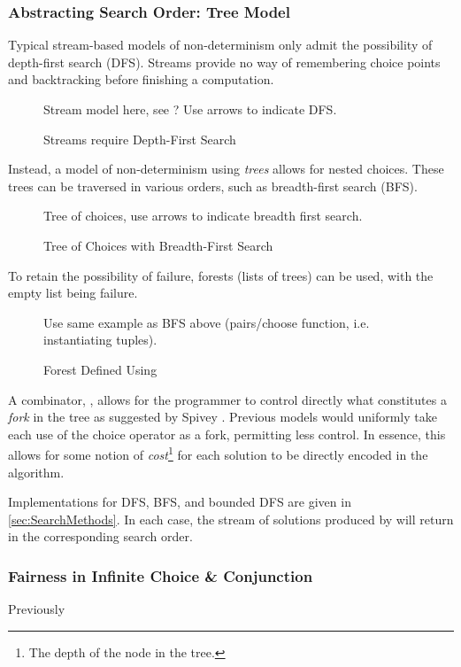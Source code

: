 \subsubsection{Abstracting Search Order: Tree Model}
Typical stream-based models of non-determinism \cite{ListOfSuccess} only admit the possibility of depth-first search (DFS). Streams provide no way of remembering choice points and backtracking before finishing a computation. 

\begin{figure}[h]
Stream model here, see \cite{BFSCombinators}?
Use arrows to indicate DFS.
\caption{Streams require Depth-First Search}
\end{figure}

Instead, a model of non-determinism using \textit{trees} allows for nested choices. These trees can be traversed in various orders, such as breadth-first search  (BFS)\cite{BFSCombinators}. 

\begin{figure}[h]
Tree of choices, use arrows to indicate breadth first search.
\caption{Tree of Choices with Breadth-First Search}
\end{figure}

To retain the possibility of failure, forests (lists of trees) can be used, with the empty list being failure.

\begin{figure}[h]
Use same example as BFS above (pairs/choose function, i.e. instantiating tuples).
\caption{Forest Defined Using }
\end{figure}

A combinator, , allows for the programmer to control directly what constitutes a \textit{fork} in the tree as suggested by Spivey \cite{Bunches}. Previous models would uniformly take each use of the choice operator as a fork, permitting less control. In essence, this allows for some notion of \textit{cost}\footnote{The depth of the node in the tree.} for each solution to be directly encoded in the algorithm.

Implementations for DFS, BFS, and bounded DFS are given in \cref{sec:SearchMethods}. In each case, the stream of solutions produced by  will return in the corresponding search order.

\subsubsection{Fairness in Infinite Choice \& Conjunction}
Previously
